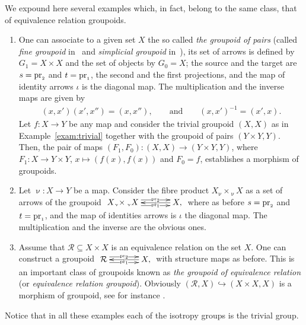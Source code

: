 \documentclass[pdftex]{sigma}
\numberwithin{equation}{section}
\newcommand{\cR}{{\mathcal R}}
\newcommand{\Sscript}[1]{\scriptscriptstyle{#1}}
\newcommand{\due}[3]{{}_{{#2 }} {#1}_{{ #3}} }
\begin{document}
\begin{Example}\label{exam:X} We expound here several examples which, in fact, belong to the same class, that of equivalence relation groupoids.
\begin{enumerate}[(1)]\itemsep=0pt
\item One can associate to a given set $X$ the so called \emph{the groupoid of pairs} (called \emph{fine groupoid} in~\cite{Brown:1987} and \emph{simplicial groupoid} in~\cite{Higgins:1971}), its set of arrows is defined by $G_{\Sscript{1}}=X \times X$ and the set of objects by $G_{\Sscript{0}}=X$; the source and the target are $s={\rm pr}_{\Sscript{2}}$ and $t={\rm pr}_{\Sscript{1}}$, the second and the first projections, and the map of identity arrows $\iota$ is the diagonal map. The multiplication and the inverse maps are given by
\begin{gather*}
(x,x') (x',x'') = (x,x''),\qquad \text{and} \qquad (x,x')^{-1} = (x',x).
\end{gather*}
Let $f\colon X\to Y$ be any map and consider the trivial groupoid $(X,X)$ as in Example~\ref{exam:trivial} together with the groupoid of pairs $(Y \times Y, Y)$. Then, the pair of maps
$(F_{\Sscript{1}}, F_{\Sscript{0}})\colon (X,X) \to (Y\times Y, Y)$, where $F_{\Sscript{1}}\colon X \to Y\times Y$, $x \mapsto (f(x), f(x))$ and $F_{\Sscript{0}}=f$, establishes a morphism of groupoids.

\item Let $\upnu\colon X \to Y$ be a map. Consider the fibre product $X \due \times {\Sscript{\upnu}} {\; \Sscript{\upnu}} X$ as a set of arrows of the groupoid $\xymatrix@C=35pt{ X \due \times {\Sscript{\upnu}} {\; \Sscript{\upnu}} X \ar@<0.8ex>@{->}|-{\scriptscriptstyle{{\rm pr}_2}}[r] \ar@<-0.8ex>@{->}|-{\scriptscriptstyle{{\rm pr}_1}}[r] & \ar@{->}|-{ \scriptscriptstyle{\iota}}[l] X, }$ where as before $s={\rm pr}_{\Sscript{2}}$ and $t={\rm pr}_{\Sscript{1}}$, and the map of identities arrows is $\iota$ the diagonal map. The multiplication and the inverse are the obvious ones.

\item Assume that $\cR \subseteq X \times X$ is an equivalence relation on the set $X$. One can construct a groupoid
$\xymatrix@C=35pt{\cR \ar@<0.8ex>@{->}|-{\scriptscriptstyle{{\rm pr}_2}}[r] \ar@<-0.8ex>@{->}|-{\scriptscriptstyle{{\rm pr}_1}}[r] & \ar@{->}|-{\scriptscriptstyle{\iota}}[l] X, }$ with structure maps as before. This is an important class of groupoids known as \emph{the groupoid of equivalence relation} (or \emph{equivalence relation groupoid}). Obviously $(\cR, X) \hookrightarrow (X\times X, X)$ is a morphism of groupoid, see for instance \cite[Example~1.4, p.~301]{DemGab:GATIGAGGC}.
\end{enumerate}
Notice that in all these examples each of the isotropy groups is the trivial group.
\end{Example}
\end{document}
